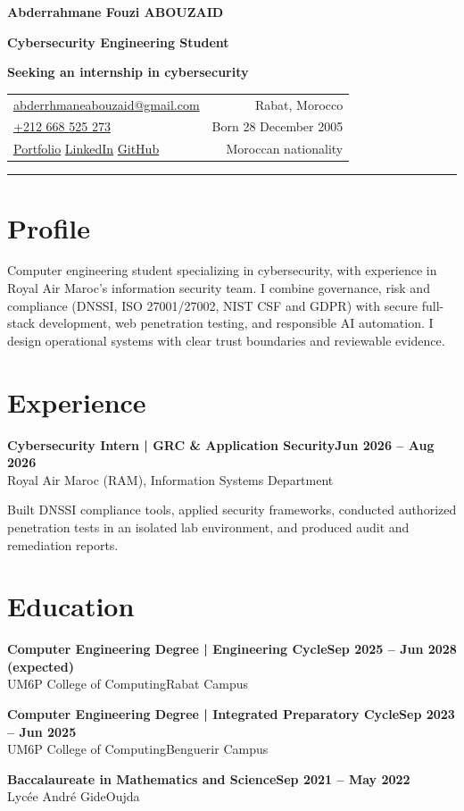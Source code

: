 \documentclass[10pt,a4paper]{article}
\newcommand{\Rule}{\vspace{1pt}\color{Signal}\rule{\linewidth}{0.55pt}\color{Ink}}
\newcommand{\CVEntry}[4]{%
  \textbf{#1}\hfill\textbf{#2}\\[-1pt]
  \textcolor{Quiet}{#3}\hfill\textcolor{Quiet}{#4}\par
}
\begin{document}
\color{Ink}

{\fontsize{17}{19}\selectfont\bfseries Abderrahmane Fouzi ABOUZAID}\par
\vspace{1pt}
{\fontsize{10.3}{12}\selectfont\color{Signal}\bfseries
Cybersecurity Engineering Student}\par
{\color{Quiet}\textbf{Seeking an internship in cybersecurity}}\par
\vspace{2pt}
\begin{tabularx}{\linewidth}{@{}Xr@{}}
\href{mailto:abderrhmaneabouzaid@gmail.com}{abderrhmaneabouzaid@gmail.com} & Rabat, Morocco \\
\href{tel:+212668525273}{+212 668 525 273} & Born 28 December 2005 \\
\href{https://abderrahmane-fouzi-abouzaid.github.io/}{Portfolio} \quad
\href{https://www.linkedin.com/in/abderrahmane-fouzi-abouzaid-2502b6331/}{LinkedIn} \quad
\href{https://github.com/Abderrahmane-Fouzi-ABOUZAID}{GitHub} & Moroccan nationality
\end{tabularx}
\Rule

\section*{Profile}
Computer engineering student specializing in cybersecurity, with experience in Royal Air Maroc's information security team. I combine governance, risk and compliance (DNSSI, ISO 27001/27002, NIST CSF and GDPR) with secure full-stack development, web penetration testing, and responsible AI automation. I design operational systems with clear trust boundaries and reviewable evidence.

\section*{Experience}
\CVEntry{Cybersecurity Intern | GRC \& Application Security}{Jun 2026 -- Aug 2026}{Royal Air Maroc (RAM), Information Systems Department}{}
Built DNSSI compliance tools, applied security frameworks, conducted authorized penetration tests in an isolated lab environment, and produced audit and remediation reports.

\section*{Education}
\CVEntry{Computer Engineering Degree | Engineering Cycle}{Sep 2025 -- Jun 2028 (expected)}{UM6P College of Computing}{Rabat Campus}
\CVEntry{Computer Engineering Degree | Integrated Preparatory Cycle}{Sep 2023 -- Jun 2025}{UM6P College of Computing}{Benguerir Campus}
\CVEntry{Baccalaureate in Mathematics and Science}{Sep 2021 -- May 2022}{Lyc\'ee Andr\'e Gide}{Oujda}
\end{document}
